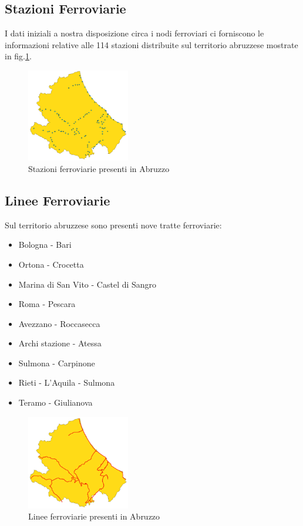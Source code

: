 \subsection{Stazioni Ferroviarie}
I dati iniziali a nostra disposizione circa i nodi ferroviari ci forniscono le informazioni relative alle 114 stazioni distribuite sul territorio abruzzese mostrate in fig.\ref{fig:regioneStazione}.
\newpage
\begin{figure}[h]
	\centering
	\includegraphics[width=0.4\textwidth]{img/regioneStazione}
	\caption{Stazioni ferroviarie presenti in Abruzzo}
    \label{fig:regioneStazione}
\end{figure}

\subsection{Linee Ferroviarie}
Sul territorio abruzzese sono presenti nove tratte ferroviarie:
\begin{itemize}
\item Bologna - Bari
\item Ortona - Crocetta
\item Marina di San Vito - Castel di Sangro
\item Roma - Pescara
\item Avezzano - Roccasecca
\item Archi stazione - Atessa
\item Sulmona - Carpinone
\item Rieti - L'Aquila - Sulmona
\item Teramo - Giulianova
\end{itemize}

\begin{figure}[h]
	\centering
	\includegraphics[width=0.4\textwidth]{img/regioneFerrovia}
	\caption{Linee ferroviarie presenti in Abruzzo}
    \label{fig:regioneFerrovia}
\end{figure}

